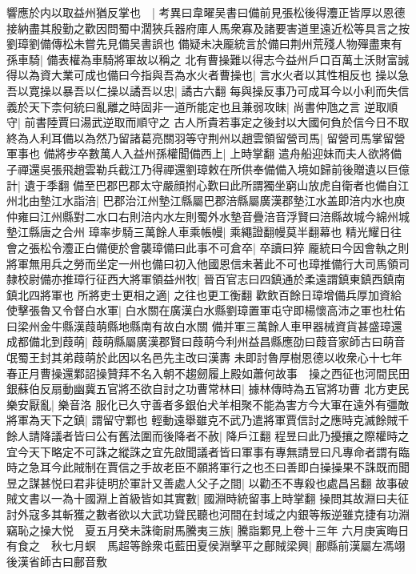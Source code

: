響應於内以取益州猶反掌也　|{
	考異曰韋曜吴書曰備前見張松後得灋正皆厚以恩德接納盡其殷勤之歡因問蜀中濶狹兵器府庫人馬衆寡及諸要害道里遠近松等具言之按劉璋劉備傳松未嘗先見備吴書誤也}
備疑未决龎統言於備曰荆州荒殘人物殫盡東有孫車騎|{
	備表權為車騎將軍故以稱之}
北有曹操難以得志今益州戶口百萬土沃財富誠得以為資大業可成也備曰今指與吾為水火者曹操也|{
	言水火者以其性相反也}
操以急吾以寛操以暴吾以仁操以譎吾以忠|{
	譎古六翻}
每與操反事乃可成耳今以小利而失信義於天下柰何統曰亂離之時固非一道所能定也且兼弱攻昧|{
	尚書仲虺之言}
逆取順守|{
	前書陸賈曰湯武逆取而順守之}
古人所貴若事定之後封以大國何負於信今日不取終為人利耳備以為然乃留諸葛亮關羽等守荆州以趙雲領留營司馬|{
	留營司馬掌留營軍事也}
備將步卒數萬人入益州孫權聞備西上|{
	上時掌翻}
遣舟船迎妹而夫人欲將備子禪還吳張飛趙雲勒兵截江乃得禪還劉璋敕在所供奉備備入境如歸前後贈遺以巨億計|{
	遺于季翻}
備至巴郡巴郡太守嚴顔拊心歎曰此所謂獨坐窮山放虎自衛者也備自江州北由墊江水詣涪|{
	巴郡治江州墊江縣屬巴郡涪縣屬廣漢郡墊江水盖即涪内水也庾仲雍曰江州縣對二水口右則涪内水左則蜀外水墊音疊涪音浮賢曰涪縣故城今綿州城墊江縣唐之合州}
璋率步騎三萬餘人車乘帳幔|{
	乘繩證翻幔莫半翻幕也}
精光耀日往會之張松令灋正白備便於會襲璋備曰此事不可倉卒|{
	卒讀曰猝}
龎統曰今因會執之則將軍無用兵之勞而坐定一州也備曰初入他國恩信未著此不可也璋推備行大司馬領司隸校尉備亦推璋行征西大將軍領益州牧|{
	晉百官志曰四鎮通於柔遠謂鎮東鎮西鎮南鎮北四將軍也}
所將吏士更相之適|{
	之往也更工衡翻}
歡飲百餘日璋增備兵厚加資給使擊張魯又令督白水軍|{
	白水關在廣漢白水縣劉璋置軍屯守即楊懷高沛之軍也杜佑曰梁州金牛縣漢葭萌縣地縣南有故白水關}
備并軍三萬餘人車甲器械資貨甚盛璋還成都備北到葭萌|{
	葭萌縣屬廣漢郡賢曰葭萌今利州益昌縣應劭曰葭音家師古曰萌音氓蜀王封其弟葭萌於此因以名邑先主改曰漢夀}
未即討魯厚樹恩德以收衆心十七年春正月曹操還鄴詔操贊拜不名入朝不趨劒履上殿如蕭何故事　操之西征也河間民田銀蘇伯反扇動幽冀五官將丕欲自討之功曹常林曰|{
	據林傳時為五官將功曹}
北方吏民樂安厭亂|{
	樂音洛}
服化已久守善者多銀伯犬羊相聚不能為害方今大軍在遠外有彊敵將軍為天下之鎮|{
	謂留守鄴也}
輕動遠舉雖克不武乃遣將軍賈信討之應時克滅餘賊千餘人請降議者皆曰公有舊法圍而後降者不赦|{
	降戶江翻}
程昱曰此乃擾攘之際權時之宜今天下略定不可誅之縱誅之宜先啟聞議者皆曰軍事有專無請昱曰凡專命者謂有臨時之急耳今此賊制在賈信之手故老臣不願將軍行之也丕曰善即白操操果不誅既而聞昱之謀甚悦曰君非徒明於軍計又善處人父子之間|{
	以勸丕不專殺也處昌呂翻}
故事破賊文書以一為十國淵上首級皆如其實數|{
	國淵時統留事上時掌翻}
操問其故淵曰夫征討外寇多其斬獲之數者欲以大武功聳民聽也河間在封域之内銀等叛逆雖克捷有功淵竊恥之操大悦　夏五月癸未誅衛尉馬騰夷三族|{
	騰詣鄴見上卷十三年}
六月庚寅晦日有食之　秋七月螟　馬超等餘衆屯藍田夏侯淵擊平之鄜賊梁興|{
	鄜縣前漢屬左馮翊後漢省師古曰鄜音敷}
